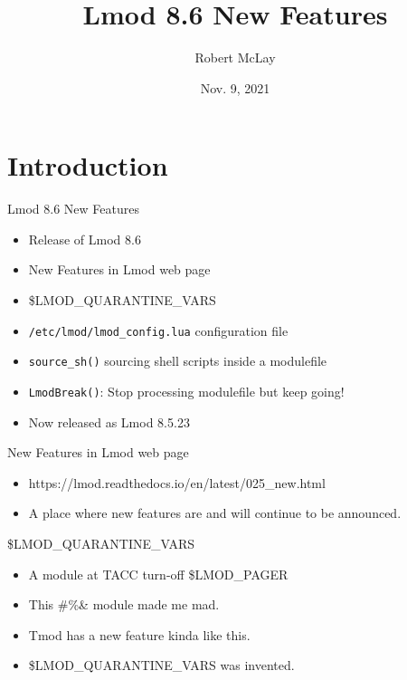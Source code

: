 \documentclass{beamer}
\begin{document}
\title[Lmod]{Lmod 8.6 New Features}
\author{Robert McLay} 
\date{Nov. 9, 2021}

\frame{\titlepage} 

\section{Introduction}

\begin{frame}{Lmod 8.6 New Features}
  \begin{itemize}
    \item Release of Lmod 8.6
    \item New Features in Lmod web page
    \item \$LMOD\_QUARANTINE\_VARS
    \item \texttt{/etc/lmod/lmod\_config.lua} configuration file
    \item \texttt{source\_sh()} sourcing shell scripts inside a
      modulefile
    \item \texttt{LmodBreak()}: Stop processing modulefile but keep
      going!
    \item Now released as Lmod 8.5.23
  \end{itemize}
\end{frame}

\begin{frame}{New Features in Lmod web page}
  \begin{itemize}
    \item https://lmod.readthedocs.io/en/latest/025\_new.html
    \item A place where new features are and will continue to be announced.
  \end{itemize}
\end{frame}

\begin{frame}{\$LMOD\_QUARANTINE\_VARS}
  \begin{itemize}
    \item A module at TACC turn-off  \$LMOD\_PAGER
    \item This \!\@\#\%\& module made me mad.
    \item Tmod has a new feature kinda like this.
    \item \$LMOD\_QUARANTINE\_VARS was invented.
  \end{itemize}
\end{frame}
\end{document}
